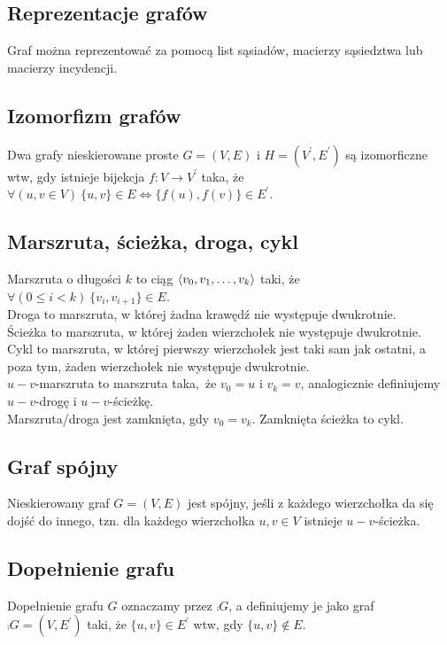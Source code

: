 \subsection*{Reprezentacje grafów}
Graf można reprezentować za pomocą list sąsiadów, macierzy sąsiedztwa lub macierzy
incydencji.

\subsection*{Izomorfizm grafów}
Dwa grafy nieskierowane proste $G = (V, E)$ i $H = (V^\prime, E^\prime)$ są
izomorficzne wtw, gdy istnieje bijekcja $f: V \to V^\prime$ taka, że
$\forall(u, v \in V) \ \{ u,v \} \in E \Leftrightarrow \{ f(u), f(v) \} \in E^\prime$.

\subsection*{Marszruta, ścieżka, droga, cykl}
Marszruta o długości $k$ to ciąg $\left\langle v_0, v_1, \ldots, v_k \right\rangle$ taki, że \\
$\forall(0 \leq i < k) \ \{ v_i, v_{i+1} \} \in E$. \\
Droga to marszruta, w której żadna krawędź nie występuje dwukrotnie. \\
Ścieżka to marszruta, w której żaden wierzchołek nie występuje dwukrotnie. \\
Cykl to marszruta, w której pierwszy wierzchołek jest taki sam jak ostatni,
a poza tym, żaden wierzchołek nie występuje dwukrotnie.\\
$u-v$-marszruta to marszruta taka, że $v_0 = u$ i $v_k = v$, analogicznie 
definiujemy $u-v$-drogę i $u-v$-ścieżkę. \\
Marszruta/droga jest zamknięta, gdy $v_0 = v_k$. Zamknięta ścieżka to cykl.

\subsection*{Graf spójny}
Nieskierowany graf $G = (V, E)$ jest spójny, jeśli z każdego wierzchołka da się
dojść do innego, tzn. dla każdego wierzchołka $u,v \in V$ istnieje $u-v$-ścieżka.

\subsection*{Dopełnienie grafu}
Dopełnienie grafu $G$ oznaczamy przez $\comp{G}$, a definiujemy je jako graf
$\comp{G} = (V, E^\prime)$ taki, że $\{ u,v \} \in E^\prime$ wtw, gdy
$\{ u,v \} \notin E$.

